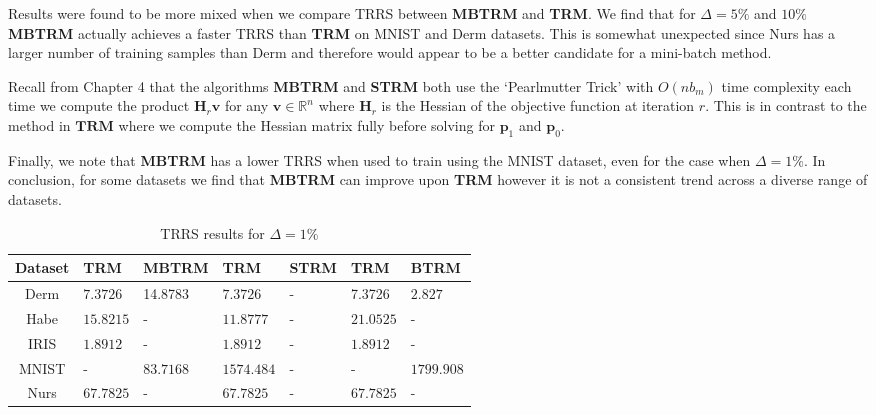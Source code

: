 \documentclass[letterpaper,12pt,titlepage,oneside,final]{book}
\begin{document}
	Results were found to be more mixed when we compare TRRS between \textbf{MBTRM} and \textbf{TRM}. We find that for $\Delta = 5\%$ and $10\%$ \textbf{MBTRM} actually achieves a faster TRRS than \textbf{TRM} on MNIST and Derm datasets. This is somewhat unexpected since Nurs has a larger number of training samples than Derm and therefore would appear to be a better candidate for a mini-batch method. 
	
	Recall from Chapter 4 that the algorithms \textbf{MBTRM} and \textbf{STRM} both use the `Pearlmutter Trick' with $O(nb_{m})$ time complexity each time we compute the product $\mathbf{H}_{r}\mathbf{v}$ for any $\mathbf{v} \in \mathbb{R}^{n}$ where $\mathbf{H}_{r}$ is the Hessian of the objective function at iteration $r$. This is in contrast to the method in $\mathbf{TRM}$ where we compute the Hessian matrix fully before solving for $\mathbf{p}_{1}$ and $\mathbf{p}_{0}$. 
	
	Finally, we note that \textbf{MBTRM} has a lower TRRS when used to train using the MNIST dataset, even for the case when $\Delta = 1\%$. In conclusion, for some datasets we find that \textbf{MBTRM} can improve upon \textbf{TRM} however it is not a consistent trend across a diverse range of datasets.
	
	\begin{table}[h] 
		\centering 
		\begin{tabular}{ |c||l|l||l|l||l|l| } 
			\hline 
			\textbf{Dataset} & \textbf{TRM} & \textbf{MBTRM} & \textbf{TRM} & \textbf{STRM} & \textbf{TRM} & \textbf{BTRM} \\ 
			\hline 
			\hline 
			Derm & $\mathbf{7.3726}$ &14.8783 & $\mathbf{7.3726}$ & - &7.3726 & $\mathbf{2.827}$\\ 
			\hline 
			Habe & $\mathbf{15.8215}$ & - & $\mathbf{11.8777}$ & - & $\mathbf{21.0525}$ & -\\ 
			\hline 
			IRIS & $\mathbf{1.8912}$ & - & $\mathbf{1.8912}$ & - & $\mathbf{1.8912}$ & -\\ 
			\hline 
			MNIST & - & $\mathbf{83.7168}$ & $\mathbf{1574.484}$ & - & - & $\mathbf{1799.908}$\\ 
			\hline 
			Nurs & $\mathbf{67.7825}$ & - & $\mathbf{67.7825}$ & - & $\mathbf{67.7825}$ & -\\ 
			\hline 
		\end{tabular} 
		\caption{TRRS results for $\Delta = 1 \%$} \label{SMBTRMTRM1}  \end{table}
	
\end{document}
